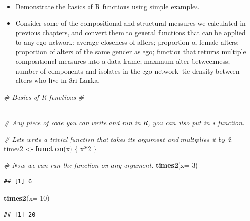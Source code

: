 \documentclass[
]{book}
\newenvironment{Shaded}{\begin{snugshade}}{\end{snugshade}}
\newcommand{\AttributeTok}[1]{\textcolor[rgb]{0.13,0.29,0.53}{#1}}
\newcommand{\CommentTok}[1]{\textcolor[rgb]{0.56,0.35,0.01}{\textit{#1}}}
\newcommand{\ControlFlowTok}[1]{\textcolor[rgb]{0.13,0.29,0.53}{\textbf{#1}}}
\newcommand{\DecValTok}[1]{\textcolor[rgb]{0.00,0.00,0.81}{#1}}
\newcommand{\FunctionTok}[1]{\textcolor[rgb]{0.13,0.29,0.53}{\textbf{#1}}}
\newcommand{\NormalTok}[1]{#1}
\newcommand{\OtherTok}[1]{\textcolor[rgb]{0.56,0.35,0.01}{#1}}
\newcommand{\SpecialCharTok}[1]{\textcolor[rgb]{0.81,0.36,0.00}{\textbf{#1}}}
\providecommand{\tightlist}{%
  \setlength{\itemsep}{0pt}\setlength{\parskip}{0pt}}
\begin{document}
\begin{itemize}
  \begin{itemize}
  \tightlist
  \item
    Demonstrate the basics of R functions using simple examples.
  \item
    Consider some of the compositional and structural measures we calculated in previous chapters, and convert them to general functions that can be applied to any ego-network: average closeness of alters; proportion of female alters; proportion of alters of the same gender as ego; function that returns multiple compositional measures into a data frame; maximum alter betweenness; number of components and isolates in the ego-network; tie density between alters who live in Sri Lanka.
  \end{itemize}
\end{itemize}

\begin{Shaded}
\begin{Highlighting}[]
\CommentTok{\# Basics of R functions}
\CommentTok{\# {-} {-} {-} {-} {-} {-} {-} {-} {-} {-} {-} {-} {-} {-} {-} {-} {-} {-} {-} {-} {-} {-} {-} {-} {-} {-} {-} {-} {-} {-} {-} {-} {-} {-} {-} {-} {-} {-} {-} }

\CommentTok{\# Any piece of code you can write and run in R, you can also put in a function.}

\CommentTok{\# Let\textquotesingle{}s write a trivial function that takes its argument and multiplies it by 2.}
\NormalTok{times2 }\OtherTok{\textless{}{-}} \ControlFlowTok{function}\NormalTok{(x) \{}
\NormalTok{  x}\SpecialCharTok{*}\DecValTok{2}
\NormalTok{\}}

\CommentTok{\# Now we can run the function on any argument.}
\FunctionTok{times2}\NormalTok{(}\AttributeTok{x=} \DecValTok{3}\NormalTok{)}
\end{Highlighting}
\end{Shaded}

\begin{verbatim}
## [1] 6
\end{verbatim}

\begin{Shaded}
\begin{Highlighting}[]
\FunctionTok{times2}\NormalTok{(}\AttributeTok{x=} \DecValTok{10}\NormalTok{)}
\end{Highlighting}
\end{Shaded}

\begin{verbatim}
## [1] 20
\end{verbatim}
\end{document}
